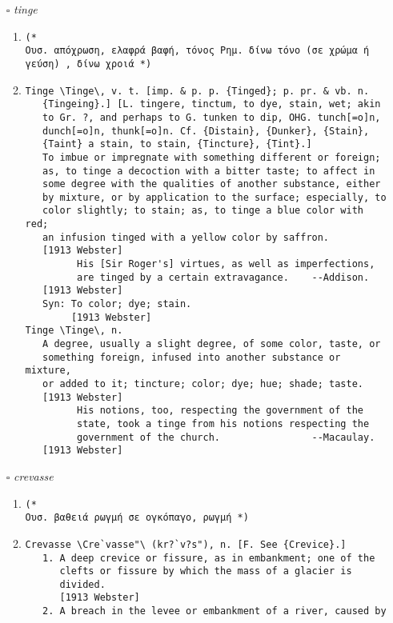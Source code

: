 \documentclass{article}
\begin{document}
\begin{itemize}
\item[$\square$] \emph{ tinge }
\begin{enumerate}
\item{
\begin{lstlisting}
(* 
Ουσ. απόχρωση, ελαφρά βαφή, τόνος Ρημ. δίνω τόνο (σε χρώμα ή γεύση) , δίνω χροιά *)
\end{lstlisting}}
\item{
\begin{lstlisting}
Tinge \Tinge\, v. t. [imp. & p. p. {Tinged}; p. pr. & vb. n.
   {Tingeing}.] [L. tingere, tinctum, to dye, stain, wet; akin
   to Gr. ?, and perhaps to G. tunken to dip, OHG. tunch[=o]n,
   dunch[=o]n, thunk[=o]n. Cf. {Distain}, {Dunker}, {Stain},
   {Taint} a stain, to stain, {Tincture}, {Tint}.]
   To imbue or impregnate with something different or foreign;
   as, to tinge a decoction with a bitter taste; to affect in
   some degree with the qualities of another substance, either
   by mixture, or by application to the surface; especially, to
   color slightly; to stain; as, to tinge a blue color with red;
   an infusion tinged with a yellow color by saffron.
   [1913 Webster]
         His [Sir Roger's] virtues, as well as imperfections,
         are tinged by a certain extravagance.    --Addison.
   [1913 Webster]
   Syn: To color; dye; stain.
        [1913 Webster]
Tinge \Tinge\, n.
   A degree, usually a slight degree, of some color, taste, or
   something foreign, infused into another substance or mixture,
   or added to it; tincture; color; dye; hue; shade; taste.
   [1913 Webster]
         His notions, too, respecting the government of the
         state, took a tinge from his notions respecting the
         government of the church.                --Macaulay.
   [1913 Webster]
\end{lstlisting}}
\end{enumerate}
\item[$\square$] \emph{ crevasse }
\begin{enumerate}
\item{
\begin{lstlisting}
(* 
Ουσ. βαθειά ρωγμή σε ογκόπαγο, ρωγμή *)
\end{lstlisting}}
\item{
\begin{lstlisting}
Crevasse \Cre`vasse"\ (kr?`v?s"), n. [F. See {Crevice}.]
   1. A deep crevice or fissure, as in embankment; one of the
      clefts or fissure by which the mass of a glacier is
      divided.
      [1913 Webster]
   2. A breach in the levee or embankment of a river, caused by

\end{lstlisting}}
\end{enumerate}
\end{itemize}
\end{document}
